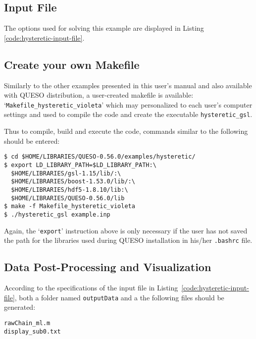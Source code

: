\subsection{Input File}\label{sec:hysteretic-input-file}


The options used for solving this example are displayed in Listing \ref{code:hysteretic-input-file}. 



\subsection{Create your own Makefile}\label{sec:hysteretic-makefile}

Similarly to the other examples presented in this user's manual and also available with QUESO distribution, a user-created makefile is available: `\texttt{Makefile\_hysteretic\_violeta}' which may personalized to each user's computer settings and used to compile the code and create the executable \verb+hysteretic_gsl+. 

Thus to compile, build and execute the code,  commands similar to the following should be entered:
\begin{lstlisting}
$ cd $HOME/LIBRARIES/QUESO-0.56.0/examples/hysteretic/
$ export LD_LIBRARY_PATH=$LD_LIBRARY_PATH:\
  $HOME/LIBRARIES/gsl-1.15/lib/:\
  $HOME/LIBRARIES/boost-1.53.0/lib/:\
  $HOME/LIBRARIES/hdf5-1.8.10/lib:\
  $HOME/LIBRARIES/QUESO-0.56.0/lib 
$ make -f Makefile_hysteretic_violeta 
$ ./hysteretic_gsl example.inp
\end{lstlisting}

Again, the `\verb+export+' instruction above is only necessary if the user has not saved the path for the libraries used during QUESO installation in his/her \verb+.bashrc+ file. 



\subsection{Data Post-Processing and Visualization}\label{sec:hysteretic-results}



According to the specifications of the input file in Listing~\ref{code:hysteretic-input-file}, both a folder named \verb+outputData+ and a the following files should be generated:
\begin{verbatim}
rawChain_ml.m 
display_sub0.txt    
\end{verbatim}

